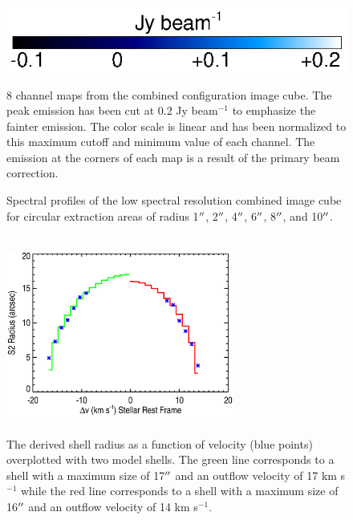 \documentclass[preprint2]{aastex}
\begin{document}
\begin{figure}[hbt!]
{         }
\includegraphics[trim=0pt 20pt 180pt 10pt]{color_bar.ps}
\caption{8 channel maps from the combined configuration image cube. The peak emission has been cut at 0.2 Jy beam${{}^{-1}}$ to emphasize the fainter emission. The color scale is linear and has been normalized to this maximum cutoff and minimum value of each channel. The emission at the corners of each map is a result of the primary beam correction.}
\label{fig:fig3}
\end{figure}


\clearpage

\begin{figure}
\caption{Spectral profiles of the low spectral resolution combined image cube for circular extraction areas of radius 1$\mbox{$^{\prime\prime}$}$, 2$\mbox{$^{\prime\prime}$}$, 4$\mbox{$^{\prime\prime}$}$, 6$\mbox{$^{\prime\prime}$}$, 8$\mbox{$^{\prime\prime}$}$, and 10$\mbox{$^{\prime\prime}$}$.}
\label{fig:fig4}
\end{figure}

\clearpage

\begin{figure}
\includegraphics[trim=45pt 0pt 30pt 0pt, width=7.5cm, height=6.5cm]{s2_size.eps}
\caption{The derived shell radius as a function of velocity (blue points) overplotted with two model shells. The green line corresponds to a shell with a maximum size of 17$\mbox{$^{\prime\prime}$}$ and an outflow velocity of 17 km s${}^{-1}$ while the red line corresponds to a shell with a maximum size of 16$\mbox{$^{\prime\prime}$}$ and an outflow velocity of 14 km s${}^{-1}$.}
\label{fig:fig4}
\end{figure}

\clearpage
\end{document}
